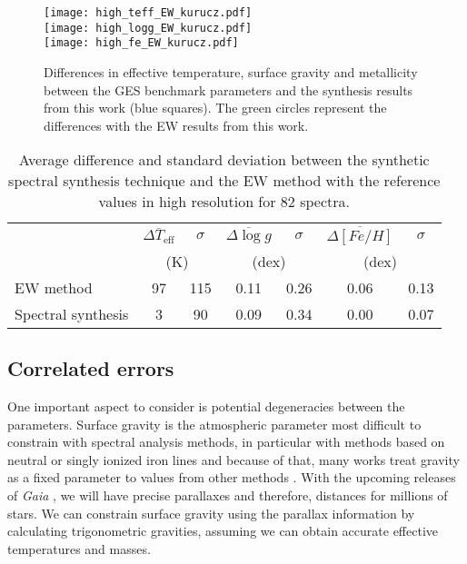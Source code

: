 \documentclass[fleqn,usenatbib]{mnras}
\begin{document}
\begin{figure}
  \centering
   \texttt{[image: high\_teff\_EW\_kurucz.pdf]} \\
   \texttt{[image: high\_logg\_EW\_kurucz.pdf]} \\
   \texttt{[image: high\_fe\_EW\_kurucz.pdf]}
  \caption{Differences in effective temperature, surface gravity and metallicity between the GES benchmark parameters and the synthesis results from this work (blue squares). The green circles 
  represent the differences with the EW results from this work.}
  \label{high_res_EW}
  \end{figure}
\begin{table}
\begin{center}
\caption{Average difference and standard deviation between the synthetic spectral synthesis technique and the EW method with the reference values in high resolution for 82 spectra.}
\label{results_table_high_EW}
\begin{tabular}{lcccccc}
\hline\hline
     & $\overline{\Delta T_{\mathrm{eff}}}$ & $\sigma$ & $\overline{\Delta \log g}$ & $\sigma$ & $\overline{\Delta [Fe/H]}$ & $\sigma$  \\
     & \multicolumn{2}{c}{(K)} & \multicolumn{2}{c}{ (dex)} & \multicolumn{2}{c}{ (dex)}  \\
\hline
EW method          & 97 & 115 & 0.11 & 0.26 & 0.06  & 0.13 \\
Spectral synthesis & 3  & 90  & 0.09 & 0.34 & 0.00  & 0.07 \\
\hline
\end{tabular}
\end{center}
\end{table}

\subsection{Correlated errors}

One important aspect to consider is potential degeneracies between the parameters. Surface gravity is the atmospheric parameter most difficult to constrain with spectral analysis 
methods, in particular with methods based on neutral or singly ionized iron lines and because of that, many works treat gravity as a fixed parameter to values from other methods 
\citep[e.g.][]{mortier13_gravity}. With the upcoming releases of \textit{Gaia} \citep{Gaia2016}, we will have precise parallaxes and therefore, distances for millions of stars. 
We can constrain surface gravity using the parallax information by calculating trigonometric gravities, assuming we can obtain accurate effective temperatures and masses.
\end{document}
